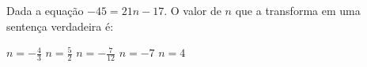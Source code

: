 Dada a equação $-45=21n-17$. O valor de $n$ que a transforma em uma sentença verdadeira é:

$n=-\frac{4}{3}$
$n=\frac{5}{2}$
$n=-\frac{7}{12}$
$n=-7$
$n=4$




